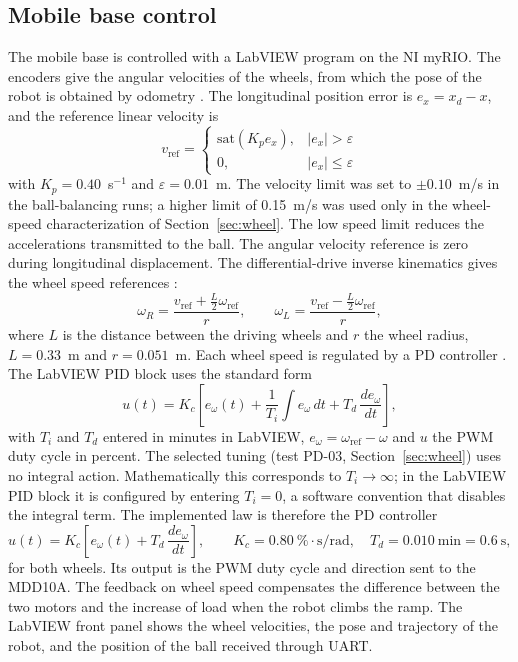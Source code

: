 \documentclass[11pt,letterpaper]{article}
\begin{document}
\subsection{Mobile base control}
The mobile base is controlled with a LabVIEW program on the NI myRIO.
The encoders give the angular velocities of the wheels, from which the
pose of the robot is obtained by odometry \cite{Siegwart2011}. The
longitudinal position error is $e_x = x_d - x$, and the reference linear
velocity is
\begin{equation}
v_{\mathrm{ref}} =
\begin{cases}
\mathrm{sat}(K_p e_x), & |e_x| > \varepsilon \\[1mm]
0, & |e_x| \leq \varepsilon
\end{cases}
\end{equation}
with $K_p = 0.40$~s$^{-1}$ and $\varepsilon = 0.01$~m. The velocity limit
was set to $\pm 0.10$~m/s in the ball-balancing runs; a higher limit of
0.15~m/s was used only in the wheel-speed characterization of
Section~\ref{sec:wheel}. The low speed limit reduces the accelerations
transmitted to the ball. The angular velocity reference is zero during
longitudinal displacement. The differential-drive inverse kinematics
gives the wheel speed references \cite{Siegwart2011}:
\begin{equation}
\omega_R = \frac{v_{\mathrm{ref}} + \frac{L}{2}\omega_{\mathrm{ref}}}{r},
\qquad
\omega_L = \frac{v_{\mathrm{ref}} - \frac{L}{2}\omega_{\mathrm{ref}}}{r},
\end{equation}
where $L$ is the distance between the driving wheels and $r$ the wheel
radius, $L=0.33$~m and $r=0.051$~m. Each wheel speed is regulated
by a PD controller \cite{Astrom2021}. The LabVIEW PID block uses the
standard form
\begin{equation}
u(t)=K_c\left[e_\omega(t)+\frac{1}{T_i}\int e_\omega\,dt+T_d\,\frac{de_\omega}{dt}\right],
\label{eq:pidlv}
\end{equation}
with $T_i$ and $T_d$ entered in minutes in LabVIEW,
$e_\omega=\omega_{\mathrm{ref}}-\omega$ and $u$ the PWM duty cycle in
percent. The selected tuning (test PD-03, Section~\ref{sec:wheel}) uses
no integral action. Mathematically this corresponds to
$T_i\to\infty$; in the LabVIEW PID block it is configured by entering
$T_i=0$, a software convention that disables the integral term. The
implemented law is therefore the PD controller
\begin{equation}
u(t)=K_c\left[e_\omega(t)+T_d\,\frac{de_\omega}{dt}\right],
\qquad K_c=0.80~\%\cdot\mathrm{s/rad},\quad
T_d=0.010~\mathrm{min}=0.6~\mathrm{s},
\label{eq:pd}
\end{equation}
for both wheels. Its output is the PWM duty cycle and direction sent to the MDD10A. The feedback on wheel speed compensates the difference
between the two motors and the increase of load when the robot climbs
the ramp. The LabVIEW front panel shows the wheel
velocities, the pose and trajectory of the robot, and the position of
the ball received through UART.
\end{document}
